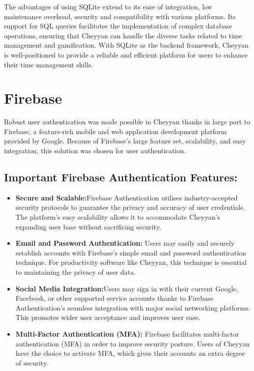 \documentclass{l4proj}
\begin{document}
The advantages of using SQLite extend to its ease of integration, low maintenance overhead, security and compatibility with various platforms. Its support for SQL queries facilitates the implementation of complex database operations, ensuring that Cheyyan can handle the diverse tasks related to time management and gamification. With SQLite as the backend framework, Cheyyan is well-positioned to provide a reliable and efficient platform for users to enhance their time management skills.


\section*{Firebase}
Robust user authentication was made possible in Cheyyan thanks in large part to Firebase, a feature-rich mobile and web application development platform provided by Google. Because of Firebase’s large feature set, scalability, and easy integration, this solution was chosen for user authentication.



\subsection*{Important Firebase Authentication Features:}

\begin{itemize}
  \item \textbf{Secure and Scalable:}Firebase Authentication utilises industry-accepted security protocols to guarantee the privacy and accuracy of user credentials. The platform’s easy scalability allows it to accommodate Cheyyan’s expanding user base without sacrificing security.

  \item \textbf{Email and Password Authentication:} 
 Users may easily and securely establish accounts with Firebase’s simple email and password authentication technique. For productivity software like Cheyyan, this technique is essential to maintaining the privacy of user data.

  \item \textbf{Social Media Integration:}Users may sign in with their current Google, Facebook, or other supported service accounts thanks to Firebase Authentication's seamless integration with major social networking platforms. This promotes wider user acceptance and improves user ease.

  \item \textbf{Multi-Factor Authentication (MFA):} Firebase facilitates multi-factor authentication (MFA) in order to improve security posture. Users of Cheyyan have the choice to activate MFA, which gives their accounts an extra degree of security.
\end{itemize}
\end{document}
